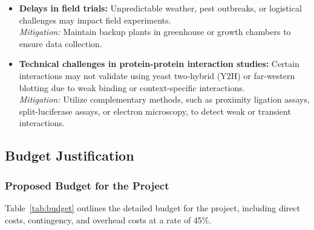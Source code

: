 \documentclass{article}
\begin{document}
\begin{itemize}
    \item \textbf{Delays in field trials:}
    Unpredictable weather, pest outbreaks, or logistical challenges may impact field experiments. \\
    \textit{Mitigation:} Maintain backup plants in greenhouse or growth chambers to ensure data collection.
    
    \item \textbf{Technical challenges in protein-protein interaction studies:}
    Certain interactions may not validate using yeast two-hybrid (Y2H) or far-western blotting due to weak binding or context-specific interactions. \\
    \textit{Mitigation:} Utilize complementary methods, such as proximity ligation assays, split-luciferase assays, or electron microscopy, to detect weak or transient interactions.
    
\end{itemize}


\subsection{Budget Justification}

\subsubsection*{Proposed Budget for the Project}

Table~\ref{tab:budget} outlines the detailed budget for the project, including direct costs, contingency, and overhead costs at a rate of 45\%.
\end{document}

